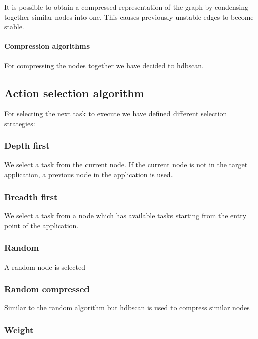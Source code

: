 It is possible to obtain a compressed representation of the graph by
condensing together similar nodes into one. This causes previously
unstable edges to become stable.

\paragraph{Compression algorithms}\label{compression-algorithms}

For compressing the nodes together we have decided to hdbscan.

\subsection{Action selection
algorithm}\label{action-selection-algorithm}

For selecting the next task to execute we have defined different
selection strategies:

\subsubsection{Depth first}\label{depth-first}

We select a task from the current node. If the current node is not in
the target application, a previous node in the application is used.

\subsubsection{Breadth first}\label{breadth-first}

We select a task from a node which has available tasks starting from the
entry point of the application.

\subsubsection{Random}\label{random}

A random node is selected

\subsubsection{Random compressed}\label{random-compressed}

Similar to the random algorithm but hdbscan is used to compress similar
nodes

\subsubsection{Weight}\label{weight}

